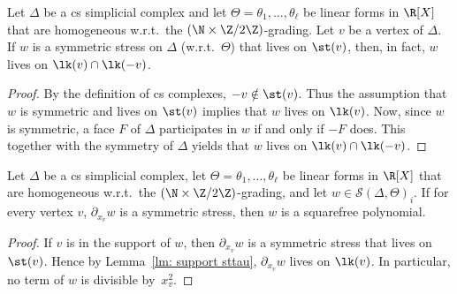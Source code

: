 \begin{lemma} \label{lm: support sttau}
	Let $\Delta$ be a cs simplicial complex and let $\Theta=\theta_1,\ldots,\theta_\ell$ be linear forms in $\R[X]$ that are homogeneous w.r.t.~the $(\N \times \Z/2\Z)$-grading. Let $v$ be a vertex of $\Delta$. If $w$ is a symmetric stress on $\Delta$ (w.r.t.~$\Theta$) that lives on $\st(v)$, then, in fact, $w$ lives on $\lk(v)\cap\lk(-v)$.
\end{lemma}

\begin{proof} By the definition of cs complexes, $-v\notin \st(v)$. Thus the assumption that $w$ is symmetric and lives on $\st(v)$ implies that $w$ lives on $\lk(v)$. Now, since $w$ is symmetric, a face $F$ of $\Delta$ participates in $w$ if and only if $-F$ does. This together with the symmetry of $\Delta$ yields that $w$ lives on $\lk(v)\cap\lk(-v)$.
\end{proof}

\begin{lemma} \label{lm: squarefree}
Let $\Delta$ be a cs simplicial complex, let $\Theta=\theta_1,\ldots,\theta_\ell$ be linear forms in $\R[X]$ that are homogeneous w.r.t.~the $(\N \times \Z/2\Z)$-grading, and let $w\in \mathcal{S}(\Delta, \Theta)_i$. If for every vertex $v$, $\partial_{x_v} w$ is a symmetric stress, then $w$ is a squarefree polynomial.
\end{lemma}

\begin{proof}
 If $v$ is in the support of $w$, then $\partial_{x_v}w$ is a symmetric stress that lives on $\st(v)$. Hence by Lemma~\ref{lm: support sttau}, $\partial_{x_v}w$ lives on $\lk(v)$. In particular, no term of $w$ is divisible by~$x_v^2$.
\end{proof}
